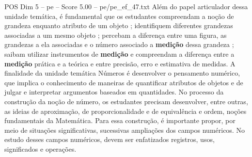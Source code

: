 \begin{textsample}{POS Dim 5 – pe – Score 5.00 – pe/pe\_ef\_47.txt}
Além do papel articulador dessa unidade temática, é fundamental que os estudantes compreendam a noção de grandeza enquanto atributo de um objeto ; identifiquem diferentes grandezas associadas a um mesmo objeto ; percebam a diferença entre uma figura, as grandezas a ela associadas e o número associado a \textbf{medição} dessa grandeza ; saibam utilizar instrumentos de \textbf{medição} e compreendam a diferença entre a \textbf{medição} prática e a teórica e entre precisão, erro e estimativa de medidas.
A finalidade da unidade temática Números é desenvolver o pensamento numérico, que implica o conhecimento de maneiras de quantificar atributos de objetos e de julgar e interpretar argumentos baseados em quantidades.
No processo da construção da noção de número, os estudantes precisam desenvolver, entre outras, as ideias de aproximação, de proporcionalidade e de equivalência e ordem, noções fundamentais da Matemática.
Para essa construção, é importante propor, por meio de situações significativas, sucessivas ampliações dos campos numéricos.
No estudo desses campos numéricos, devem ser enfatizados registros, usos, significados e operações.

\end{textsample}
